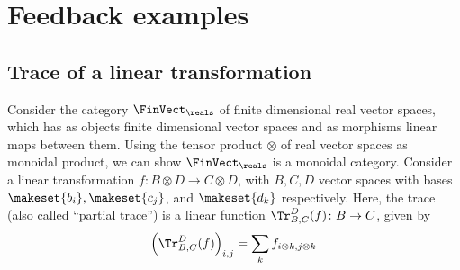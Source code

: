 
\section{Feedback examples}
\publictodomessage

\subsection{Trace of a linear transformation}
\label{subsec:trace-linear}
Consider the category $\FinVect_\reals$ of finite dimensional real vector spaces, which has as objects finite dimensional vector spaces and as morphisms linear maps between them.
Using the tensor product $\otimes$ of real vector spaces as monoidal product, we can show $\FinVect_\reals$ is a monoidal category.
Consider a linear transformation $f\colon B\otimes D\to C\otimes D$, with $B,C,D$ vector spaces with bases $\makeset{b_i},\makeset{c_j}$, and $\makeset{d_k}$ respectively.
Here, the trace (also called ``partial trace'') is a linear function $\Tr_{B,C}
    ^D(f)\colon B\to C$, given by
\begin{equation}
    \left(\Tr_{B,C}
    ^D(f) \right)_{i,j}=\sum_{k}f_{i\otimes k,j\otimes k}
\end{equation}

